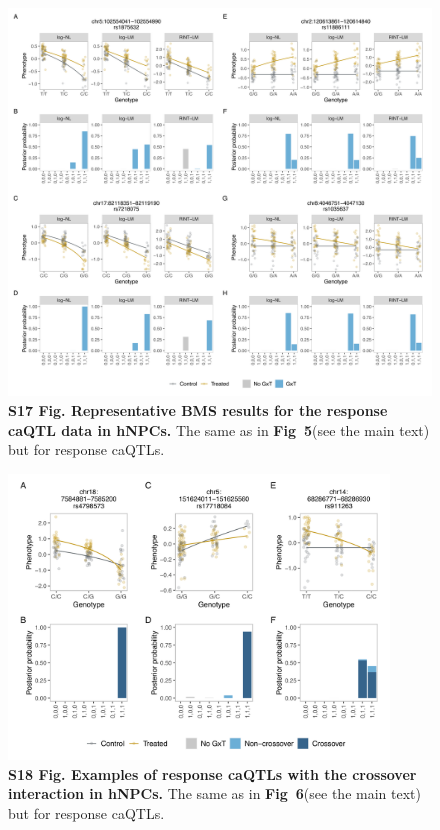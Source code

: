 \documentclass[11pt]{article}
\newcommand{\figwntrnabms}{\textbf{Fig~5}\xspace}
\newcommand{\figwntrnadiv}{\textbf{Fig~6}\xspace}
\begin{document}
\begin{figure}[!ht]
\begin{center}
  \includegraphics[width=1\textwidth]{png/wntatac_gp.png}
\end{center}  
\caption{
  {\bf
    S17 Fig.
    Representative BMS results for the response caQTL data in hNPCs.}
The same as in \figwntrnabms (see the main text) but for response caQTLs. 
}
\end{figure}
\label{s-fig:wntatac-gp}

\begin{figure}[!ht]
\begin{center}
  \includegraphics[width=0.9\textwidth]{png/wntatac_gp_co.png}
\end{center}  
\caption{
  {\bf
    S18 Fig.
    Examples of response caQTLs with the crossover interaction in hNPCs.}
The same as in \figwntrnadiv (see the main text) but for response caQTLs. 
}
\label{s-fig:wntatac-div}
\end{figure}
\end{document}
